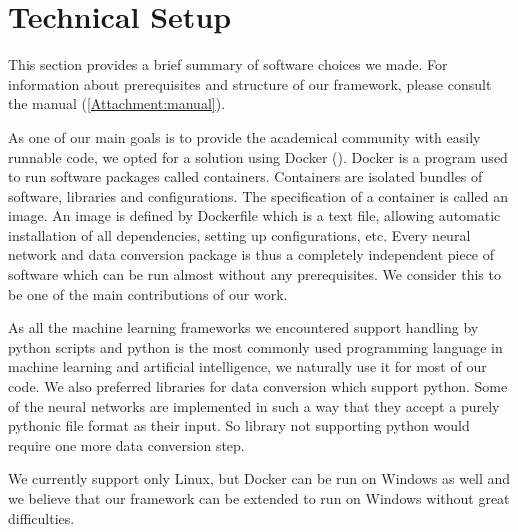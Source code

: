 \section{Technical Setup}
This section provides a brief summary of software choices we made. For information about prerequisites and structure of our framework, please consult the manual (\autoref{Attachment:manual}). \par
As one of our main goals is to provide the academical community with easily runnable code, we opted for a solution using Docker (\cite{merkel_docker:_2014}). Docker is a program used to run software packages called containers. Containers are isolated bundles of software, libraries and configurations. The specification of a container is called an image. An image is defined by Dockerfile which is a text file, allowing automatic installation of all dependencies, setting up configurations, etc. Every neural network and data conversion package is thus a completely independent piece of software which can be run almost without any prerequisites. We consider this to be one of the main contributions of our work. \par
As all the machine learning frameworks we encountered support handling by python scripts and python is the most commonly used programming language in machine learning and artificial intelligence, we naturally use it for most of our code. We also preferred libraries for data conversion which support python. Some of the neural networks are implemented in such a way that they accept a purely pythonic file format as their input. So library not supporting python would require one more data conversion step.\par
We currently support only Linux, but Docker can be run on Windows as well and we believe that our framework can be extended to run on Windows without great difficulties. 
